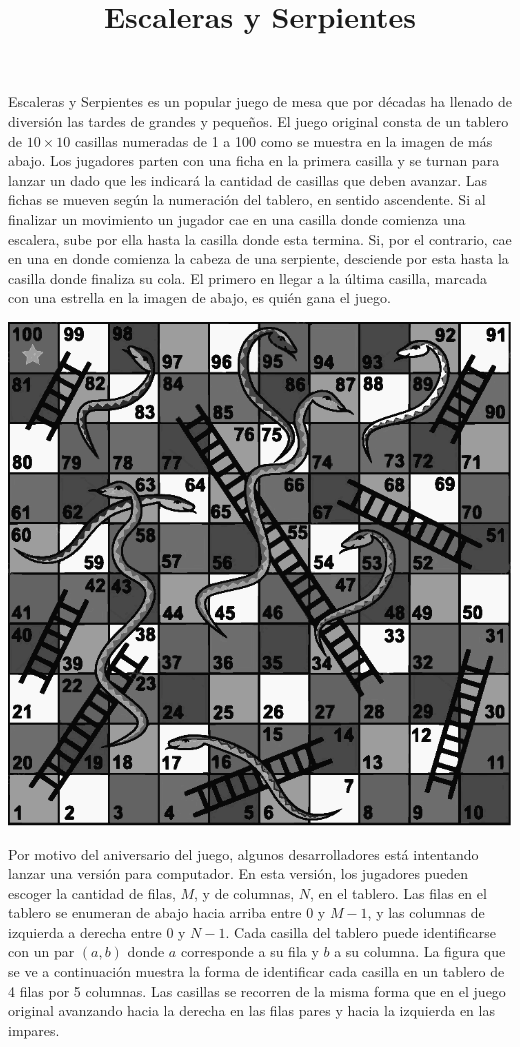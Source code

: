 \documentclass{oci}
\title{Escaleras y Serpientes}
\begin{document}
\begin{problemDescription}
  Escaleras y Serpientes es un popular juego de mesa que por décadas ha
  llenado de diversión las tardes de grandes y pequeños.
  El juego original consta de un tablero de $10\times 10$ casillas numeradas de
  1 a 100 como se muestra en la imagen de más abajo.
  Los jugadores parten con una ficha en la primera casilla y se turnan para
  lanzar un dado que les indicará la cantidad de casillas que deben avanzar.
  Las fichas se mueven según la numeración del tablero, en sentido ascendente.
  Si al finalizar un movimiento un jugador cae en una casilla donde comienza una
  escalera, sube por ella hasta la casilla donde esta termina.
  Si, por el contrario, cae en una en donde comienza la cabeza de una serpiente,
  desciende por esta hasta la casilla donde finaliza su cola. 
  El primero en llegar a la última casilla, marcada con una estrella en la
  imagen de abajo, es quién gana el juego.
  
  \begin{center}
  \includegraphics[scale=0.8]{tablero}
  \end{center}

  Por motivo del aniversario del juego, algunos desarrolladores está intentando
  lanzar una versión para computador.
  En esta versión, los jugadores pueden escoger la cantidad de filas, $M$, y de
  columnas, $N$, en el tablero.
  Las filas en el tablero se enumeran de abajo hacia arriba entre 0 y $M-1$, y
  las columnas de izquierda a derecha entre 0 y $N-1$.
  Cada casilla del tablero puede identificarse con un par $(a, b)$ donde $a$
  corresponde a su fila y $b$ a su columna.
  La figura que se ve a continuación muestra la forma de identificar cada
  casilla en un tablero de 4 filas por 5 columnas.
  Las casillas se recorren de la misma forma que en el juego original avanzando
  hacia la derecha en las filas pares y hacia la izquierda en las impares.


\end{problemDescription}
\end{document}
